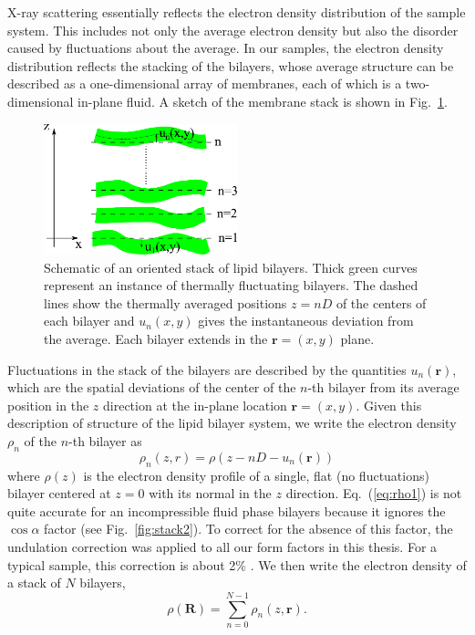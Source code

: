 X-ray scattering essentially reflects the electron density distribution
of the sample system. This includes not only the average electron
density but also the disorder caused by fluctuations about the average.
In our samples, the electron density distribution reflects
the stacking of the bilayers, whose average structure can be described
as a one-dimensional array of membranes, each of which is a two-dimensional
in-plane fluid. A sketch of the membrane stack is shown in Fig.~\ref{fig:stack}.

\begin{figure}[htbp]
  \centering
  \includegraphics[width=0.5\textwidth]{figures/Tat/stack}
  \caption{Schematic of an oriented stack of lipid bilayers. Thick green curves
  represent an instance of thermally fluctuating bilayers. The dashed lines 
  show the thermally averaged positions $z=nD$ of the centers of each bilayer 
  and $u_{n}(x,y)$ gives the instantaneous deviation from the average. 
  Each bilayer extends in the $\mathbf{r}=\left(x,y\right)$ plane.}
  \label{fig:stack}
\end{figure}

Fluctuations in the stack of the bilayers are described by the
quantities $u_{n}\left(\mathbf{r}\right)$, which are the spatial
deviations of the center of the $n$-th bilayer 
from its average position in the $z$ direction
at the in-plane location $\mathbf{r}=(x,y)$.
Given this description of structure of the lipid bilayer system, we
write the electron density $\rho _{n}$ of the $n$-th bilayer as 
\begin{equation}
  \rho_n(z,r) = \rho(z-nD-u_{n}(\mathbf{r}))
  \label{eq:rho1}
\end{equation}
where $\rho(z)$ is the electron density profile of a single, flat 
(no fluctuations) bilayer centered at $z=0$ with its normal in the 
$z$ direction. Eq.~(\ref{eq:rho1}) is not quite accurate for an incompressible
fluid phase bilayers because it ignores the $\cos\alpha$ factor \cite{Liu03} 
(see Fig.~\ref{fig:stack2}). To correct for the absence of this factor, 
the undulation correction \cite{Nagle00} was applied to all our 
form factors in this thesis. For a typical sample, this correction is about 
2\% \cite{Liu03}. We then write the electron density of a stack of $N$ bilayers,
\begin{equation}
  \rho \left(\mathbf{R}\right)=\sum _{n=0}^{N-1}\rho _{n}\left(z,\mathbf{r}\right).
  \label{eq:rho3}
\end{equation}

